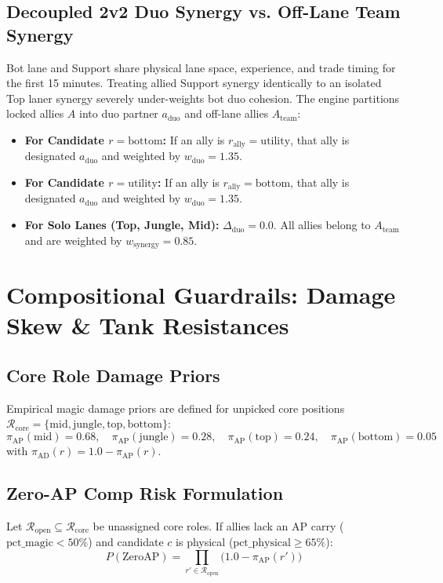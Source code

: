 \documentclass[11pt,a4paper]{article}
\begin{document}
\subsection{Decoupled 2v2 Duo Synergy vs. Off-Lane Team Synergy}
Bot lane and Support share physical lane space, experience, and trade timing for the first 15 minutes. Treating allied Support synergy identically to an isolated Top laner synergy severely under-weights bot duo cohesion. The engine partitions locked allies $A$ into duo partner $a_{\text{duo}}$ and off-lane allies $A_{\text{team}}$:
\begin{itemize}
  \item \textbf{For Candidate $r = \text{bottom}$:} If an ally is $r_{\text{ally}} = \text{utility}$, that ally is designated $a_{\text{duo}}$ and weighted by $w_{\text{duo}} = 1.35$.
  \item \textbf{For Candidate $r = \text{utility}$:} If an ally is $r_{\text{ally}} = \text{bottom}$, that ally is designated $a_{\text{duo}}$ and weighted by $w_{\text{duo}} = 1.35$.
  \item \textbf{For Solo Lanes (Top, Jungle, Mid):} $\Delta_{\text{duo}} = 0.0$. All allies belong to $A_{\text{team}}$ and are weighted by $w_{\text{synergy}} = 0.85$.
\end{itemize}

\section{Compositional Guardrails: Damage Skew \& Tank Resistances}

\subsection{Core Role Damage Priors}
Empirical magic damage priors are defined for unpicked core positions $\mathcal{R}_{\text{core}} = \{\text{mid}, \text{jungle}, \text{top}, \text{bottom}\}$:
\begin{equation}
\pi_{\text{AP}}(\text{mid}) = 0.68, \quad \pi_{\text{AP}}(\text{jungle}) = 0.28, \quad \pi_{\text{AP}}(\text{top}) = 0.24, \quad \pi_{\text{AP}}(\text{bottom}) = 0.05
\end{equation}
with $\pi_{\text{AD}}(r) = 1.0 - \pi_{\text{AP}}(r)$.

\subsection{Zero-AP Comp Risk Formulation}
Let $\mathcal{R}_{\text{open}} \subseteq \mathcal{R}_{\text{core}}$ be unassigned core roles. If allies lack an AP carry ($\text{pct\_magic} < 50\%$) and candidate $c$ is physical ($\text{pct\_physical} \ge 65\%$):
\begin{equation}
P(\text{ZeroAP}) = \prod_{r' \in \mathcal{R}_{\text{open}}} \big(1.0 - \pi_{\text{AP}}(r')\big)
\end{equation}
\end{document}
